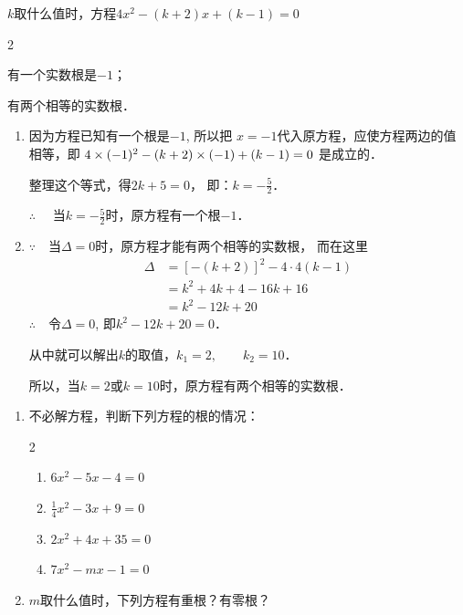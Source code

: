 \begin{example}
    $k$取什么值时，方程$4x^2-(k+2)x+(k-1)=0$
    \begin{enumerate}
        \begin{multicols}{2}
              \item 有一个实数根是$-1$；
        \item 有两个相等的实数根．
        \end{multicols}
    \end{enumerate}
\end{example}

\begin{solution}
\begin{enumerate}
    \item 因为方程已知有一个根是$-1$, 所以把
$x=-1$代入原方程，应使方程两边的值相等，即
$4\times(-1)^2-(k+2)\times(-1)+(k-1)=0$ 是成立的．

整理这个等式，得$2k+5=0$，
即：$k=-\frac{5}{2}$．

$\therefore\quad $ 当$k=-\frac{5}{2}$时，原方程有一个根$-1$．

\item $\because\quad $当$\Delta =0$时，原方程才能有两个相等的实数根，
而在这里
\[\begin{split}
    \Delta &=[-(k+2)]^2-4\cdot 4(k-1)\\
    &=k^2+4k+4-16k+16\\
    &=k^2-12k+20
\end{split}\]
$\therefore\quad $令$\Delta=0$, 即$k^2-12k+20=0$．

从中就可以解出$k$的取值，$k_1=2,\qquad k_2=10$．

所以，当$k=2$或$k=10$时，原方程有两个相等的实数根．

\end{enumerate}
\end{solution}

\begin{ex}
\begin{enumerate}
    \item 不必解方程，判断下列方程的根的情况：
    \begin{multicols}{2}
    \begin{enumerate}
        \item $6x^2-5x-4=0$
        \item $\frac{1}{4}x^2-3x+9=0$
        \item $2x^2+4x+35=0$
        \item $7x^2-mx-1=0$
    \end{enumerate}
    \end{multicols}
    
    \item $m$取什么值时，下列方程有重根？有零根？
    \begin{enumerate}
    \end{enumerate}
\end{enumerate}
\end{ex}

